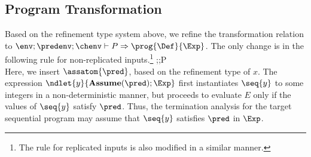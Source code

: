 \subsection{Program Transformation}
\label{sec:rx}



Based on the refinement type system above,
we refine the transformation relation to
$\env; \predenv; \chenv \vdash P \Rightarrow \prog{\Def}{\Exp}$.
The only change is in the following rule for non-replicated inputs.\footnote{The rule for replicated inputs is also modified in a similar manner.}
        {\env;\predenv;\chenv \vdash {}P
          \qquad\qquad\qquad\qquad\qquad\qquad\qquad\qquad         \\
          \Rightarrow
          }
        Here, we insert \(\assatom{\pred}\), based on the refinement type
        of \(x\).
        The expression \(\ndlet{y}{\textbf{Assume}(\pred);\Exp}\) first
        instantiates \(\seq{y}\) to some integers in a non-deterministic manner,
        but proceeds to evaluate \(E\) only if the values of \(\seq{y}\) satisfy
        \(\pred\). Thus, the termination analysis for the target sequential program may assume that
       \(\seq{y}\) satisfies \(\pred\) in \(\Exp\).
        



